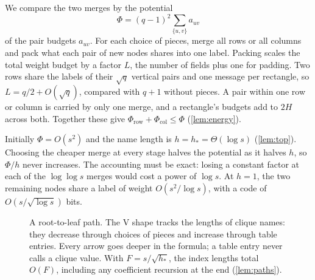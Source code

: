 \documentclass[11pt]{article}
\theoremstyle{definition}
\theoremstyle{definition}
\theoremstyle{remark}
\newcommand{\row}{\mathrm{row}}
\newcommand{\col}{\mathrm{col}}
\begin{document}
We compare the two merges by the potential
\[
\Phi=(q-1)^2\sum_{\{u,v\}}a_{uv}
\]
of the pair budgets $a_{uv}$. For each choice of pieces, merge all rows or all columns and pack what each pair of new nodes shares into one label. Packing scales the total weight budget by a factor $L$, the number of fields plus one for padding. Two rows share the labels of their $\sqrt q$ vertical pairs and one message per rectangle, so $L=q/2+O(\sqrt q)$, compared with $q+1$ without pieces. A pair within one row or column is carried by only one merge, and a rectangle's budgets add to $2H$ across both. Together these give $\Phi_\row+\Phi_\col\le\Phi$ (\cref{lem:energy}).

Initially $\Phi=O(s^2)$ and the name length is $h=h_*=\Theta(\log s)$ (\cref{lem:top}). Choosing the cheaper merge at every stage halves the potential as it halves $h$, so $\Phi/h$ never increases. The accounting must be exact: losing a constant factor at each of the $\log\log s$ merges would cost a power of $\log s$. At $h=1$, the two remaining nodes share a label of weight $O(s^2/\log s)$, with a code of $O(s/\sqrt{\log s})$ bits.

\begin{figure}[!htbp]
\centering
{}
\caption{A root-to-leaf path. The V shape tracks the lengths of clique names: they decrease through choices of pieces and increase through table entries. Every arrow goes deeper in the formula; a table entry never calls a clique value. With $F=s/\sqrt{h_*}$, the index lengths total $O(F)$, including any coefficient recursion at the end (\cref{lem:paths}).}
\label{fig:path}
\end{figure}
\end{document}
